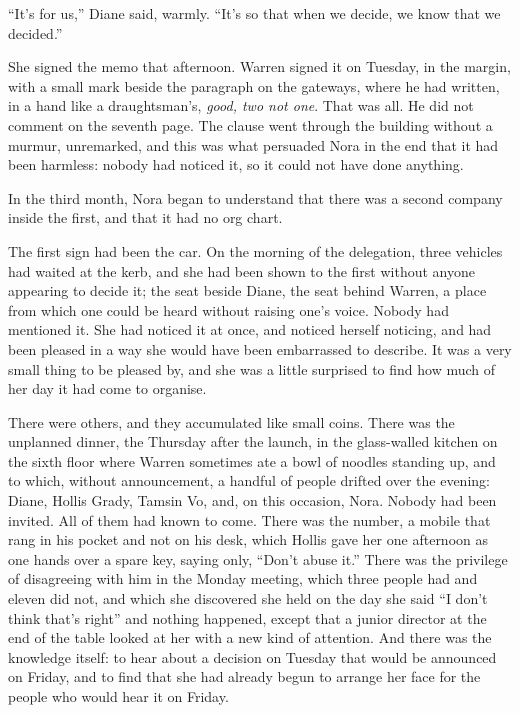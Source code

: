 ``It's for us,'' Diane said, warmly. ``It's so that when we decide, we know that we decided.''

She signed the memo that afternoon. Warren signed it on Tuesday, in the margin, with a small mark beside the paragraph on the gateways, where he had written, in a hand like a draughtsman's, \emph{good, two not one}. That was all. He did not comment on the seventh page. The clause went through the building without a murmur, unremarked, and this was what persuaded Nora in the end that it had been harmless: nobody had noticed it, so it could not have done anything.

\scenebreak
\noindent In the third month, Nora began to understand that there was a second company inside the first, and that it had no org chart.

The first sign had been the car. On the morning of the delegation, three vehicles had waited at the kerb, and she had been shown to the first without anyone appearing to decide it; the seat beside Diane, the seat behind Warren, a place from which one could be heard without raising one's voice. Nobody had mentioned it. She had noticed it at once, and noticed herself noticing, and had been pleased in a way she would have been embarrassed to describe. It was a very small thing to be pleased by, and she was a little surprised to find how much of her day it had come to organise.

There were others, and they accumulated like small coins. There was the unplanned dinner, the Thursday after the launch, in the glass-walled kitchen on the sixth floor where Warren sometimes ate a bowl of noodles standing up, and to which, without announcement, a handful of people drifted over the evening: Diane, Hollis Grady, Tamsin Vo, and, on this occasion, Nora. Nobody had been invited. All of them had known to come. There was the number, a mobile that rang in his pocket and not on his desk, which Hollis gave her one afternoon as one hands over a spare key, saying only, ``Don't abuse it.'' There was the privilege of disagreeing with him in the Monday meeting, which three people had and eleven did not, and which she discovered she held on the day she said ``I don't think that's right'' and nothing happened, except that a junior director at the end of the table looked at her with a new kind of attention. And there was the knowledge itself: to hear about a decision on Tuesday that would be announced on Friday, and to find that she had already begun to arrange her face for the people who would hear it on Friday.

